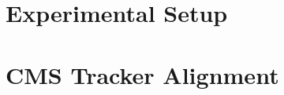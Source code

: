 \documentclass[print]{nuthesis}
\begin{document}













\chapter{Experimental Setup} %
\label{sec:Exp}



\chapter{CMS Tracker Alignment} %
\label{sec:alignment}



%
%
%
%
%
%
%


%




\nocite{*}
\backmatter

\appendix



\end{document}
